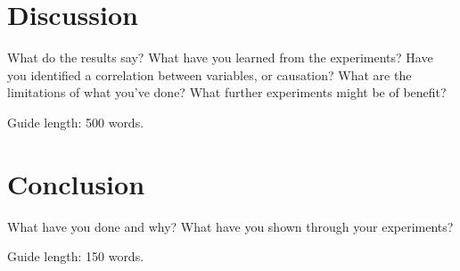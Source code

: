 \documentclass{csfourzero}
\begin{document}
\section{Discussion}
\label{sec:discuss}

What do the results say? What have you learned from the
experiments? Have you identified a correlation between variables, or
causation? What are the limitations of what you've done? What further
experiments might be of benefit?

Guide length: 500 words.

\section{Conclusion}
\label{sec:conc}

What have you done and why? What have you shown through your
experiments?

Guide length: 150 words.



\end{document}
